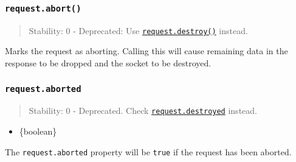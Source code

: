 \begin{Shaded}
\begin{Highlighting}[]
  \OperatorTok{=}\OperatorTok{;}
\NormalTok{()}\OperatorTok{;}

\NormalTok{(}\OperatorTok{,}\OperatorTok{,}\OperatorTok{,}\KeywordTok{=\textgreater{}}\NormalTok{ \{}
    \NormalTok{(}\NormalTok{)}\OperatorTok{;}
\NormalTok{()}\OperatorTok{;}
    \NormalTok{(}\NormalTok{)}\OperatorTok{;}
\NormalTok{  \})}\OperatorTok{;}
\NormalTok{\})}\OperatorTok{;}
\end{Highlighting}
\end{Shaded}

\subsubsection{\texorpdfstring{\texttt{request.abort()}}{request.abort()}}\label{request.abort}

\begin{quote}
Stability: 0 - Deprecated: Use
\hyperref[requestdestroyerror]{\texttt{request.destroy()}} instead.
\end{quote}

Marks the request as aborting. Calling this will cause remaining data in
the response to be dropped and the socket to be destroyed.

\subsubsection{\texorpdfstring{\texttt{request.aborted}}{request.aborted}}\label{request.aborted}

\begin{quote}
Stability: 0 - Deprecated. Check
\hyperref[requestdestroyed]{\texttt{request.destroyed}} instead.
\end{quote}

\begin{itemize}
\tightlist
\item
  \{boolean\}
\end{itemize}

The \texttt{request.aborted} property will be \texttt{true} if the
request has been aborted.

